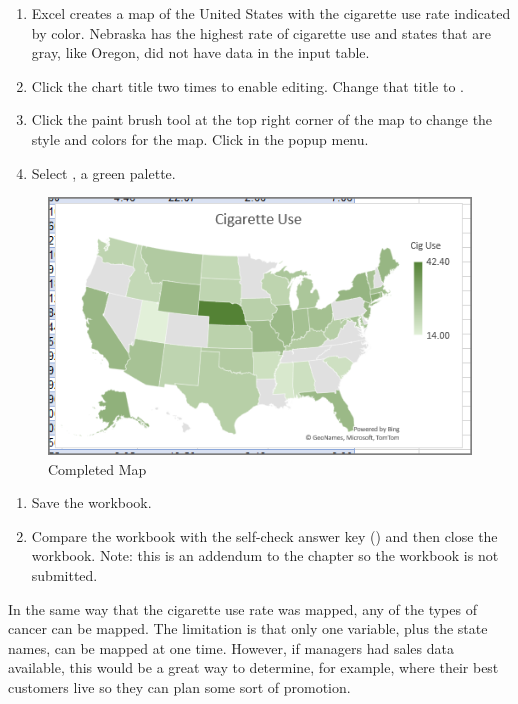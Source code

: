 \begin{enumerate}[resume]	
	\item Excel creates a map of the United States with the cigarette use rate indicated by color. Nebraska has the highest rate of cigarette use and states that are gray, like Oregon, did not have data in the input table.
	\item Click the chart title two times to enable editing. Change that title to .
	\item Click the paint brush tool at the top right corner of the map to change the style and colors for the map. Click  in the popup menu.
	\item Select , a green palette.
\end{enumerate}

\begin{figure}[H]
	\centering
	\includegraphics[width=\maxwidth{.95\linewidth}]{gfx/ch08_fig91}
	\caption{Completed Map}
	\label{08:fig91}
\end{figure}

\begin{enumerate}[resume]
	\item Save the  workbook.
	
	\item Compare the workbook with the self-check answer key () and then close the  workbook. Note: this is an addendum to the chapter so the workbook is not submitted.
	
\end{enumerate}

In the same way that the cigarette use rate was mapped, any of the types of cancer can be mapped. The limitation is that only one variable, plus the state names, can be mapped at one time. However, if managers had sales data available, this would be a great way to determine, for example, where their best customers live so they can plan some sort of promotion.



